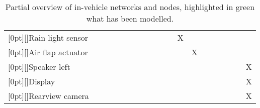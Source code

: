 \begin{table}[htb]
{\begin{tabular}{@{}>{\columncolor{white}[0pt][\tabcolsep]}lllllllllllllllllll@{}}
    Rain light sensor                            &       &       &       &       &       &       &       &       &       &       & X     & \multicolumn{1}{c|}{}  &       &       &       &       &       &   \\
    Air flap actuator                            &       &       &       &       &       &       &       &       &       &       &       & \multicolumn{1}{c|}{X} &       &       &       &       &       &   \\
    Speaker left                                 &       &       &       &       &       &       &       &       &       &       &       & \multicolumn{1}{c|}{}  &       &       &       &       &       & X \\
    Display                                      &       &       &       &       &       &       &       &       &       &       &       & \multicolumn{1}{c|}{}  &       &       &       &       &       & X \\
    Rearview camera                              &       &       &       &       &       &       &       &       &       &       &       & \multicolumn{1}{c|}{}  &       &       &       &       &       & X \\
\end{tabular}%
}
\caption{Partial overview of in-vehicle networks and nodes, highlighted in green what has been modelled.}
\label{tab:networkoverview}
\end{table}
\endgroup